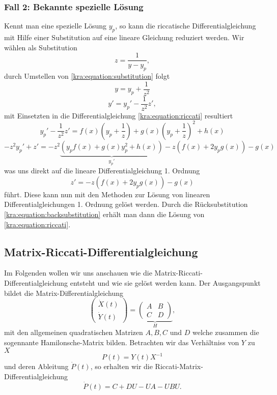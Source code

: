 \subsubsection{Fall 2: Bekannte spezielle Lösung}
Kennt man eine spezielle Lösung $y_p$, so kann die riccatische Differentialgleichung mit Hilfe einer Substitution auf eine lineare Gleichung reduziert werden.
Wir wählen als Substitution
\begin{equation} \label{kra:equation:substitution}
    z = \frac{1}{y - y_p},
\end{equation}
durch Umstellen von \eqref{kra:equation:substitution} folgt
\begin{equation}
    y = y_p + \frac{1}{z^2} \label{kra:equation:backsubstitution}
\end{equation}
\begin{equation}
    y' = y_p' - \frac{1}{z^2}z',
\end{equation}
mit Einsetzten in die Differentialgleichung \eqref{kra:equation:riccati} resultiert
\begin{equation}
    y_p' - \frac{1}{z^2}z' = f(x)(y_p + \frac{1}{z}) + g(x)(y_p + \frac{1}{z})^2 + h(x)
\end{equation}
\begin{equation}
    -z^{2}y_p' + z' = -z^2\underbrace{(y_{p}f(x) + g(x)y_p^2 + h(x))}_{\displaystyle{y_p'}} - z(f(x) + 2y_{p}g(x)) - g(x)
\end{equation}
was uns direkt auf die lineare Differentialgleichung 1. Ordnung
\begin{equation}
    z' = -z(f(x) + 2y_{p}g(x)) - g(x)
\end{equation}
führt.
Diese kann nun mit den Methoden zur Lösung von linearen Differentialgleichungen 1. Ordnung gelöst werden.
Durch die Rücksubstitution \eqref{kra:equation:backsubstitution} erhält man dann die Lösung von \eqref{kra:equation:riccati}.

\subsection{Matrix-Riccati-Differentialgleichung} \label{kra:loesung:riccati}
Im Folgenden wollen wir uns anschauen wie die Matrix-Riccati-Differentialgleichung entsteht und wie sie gelöst werden kann.
Der Ausgangspunkt bildet die Matrix-Differentialgleichung
\begin{equation}
    \label{kra:equation:matrix-dgl}
    \begin{pmatrix}
        \dot{X}(t) \\
        \dot{Y}(t)
    \end{pmatrix}
    =
    \underbrace{
        \begin{pmatrix}
            A & B \\
            C & D
        \end{pmatrix}
    }_{\displaystyle{H}},
\end{equation}
mit den allgemeinen quadratischen Matrizen $A, B, C$ und $D$ welche zusammen die sogennante Hamilonsche-Matrix bilden.
Betrachten wir das Verhältniss von $Y$ zu $X$
\[
    P(t) = Y(t)X^{-1}
\]
und deren Ableitung $\dot{P}(t)$, so erhalten wir die Riccati-Matrix-Differentialgleichung
\[
    \dot{P}(t) = C  + DU - UA - UBU.
\]

